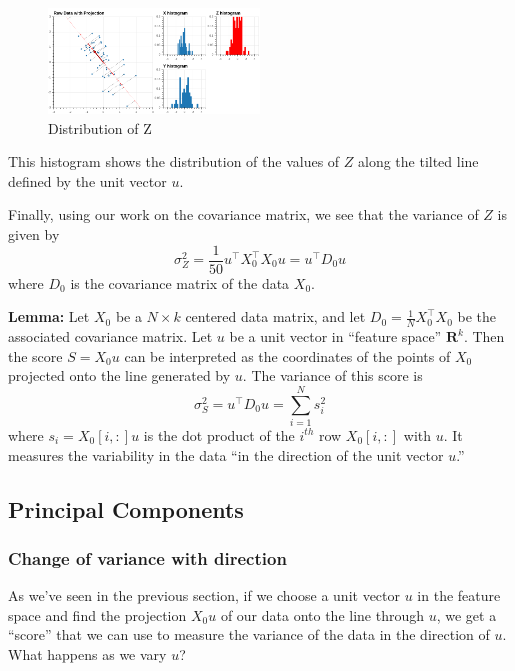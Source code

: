 \documentclass[
]{article}
\begin{document}
\begin{figure}
\hypertarget{fig:pcasimfig-3}{%
\centering
\includegraphics[width=0.5\textwidth,height=\textheight]{../img/PCAsimulated-4.png}
\caption{Distribution of Z}\label{fig:pcasimfig-3}
}
\end{figure}

This histogram shows the distribution of the values of \(Z\) along the
tilted line defined by the unit vector \(u\).

Finally, using our work on the covariance matrix, we see that the
variance of \(Z\) is given by \[
\sigma_{Z}^2 = \frac{1}{50}u^{\intercal}X_{0}^{\intercal}X_{0}u = u^{\intercal}D_{0}u
\] where \(D_{0}\) is the covariance matrix of the data \(X_{0}\).

\textbf{Lemma:} Let \(X_{0}\) be a \(N\times k\) centered data matrix,
and let \(D_{0}=\frac{1}{N}X_{0}^{\intercal}X_{0}\) be the associated
covariance matrix. Let \(u\) be a unit vector in ``feature space''
\(\mathbf{R}^{k}\). Then the score \(S=X_{0}u\) can be interpreted as
the coordinates of the points of \(X_{0}\) projected onto the line
generated by \(u\). The variance of this score is \[
\sigma^{2}_{S} = u^{\intercal}D_{0}u = \sum_{i=1}^{N} s_{i}^2
\] where \(s_{i} = X_{0}[i,:]u\) is the dot product of the \(i^{th}\)
row \(X_{0}[i,:]\) with \(u\). It measures the variability in the data
``in the direction of the unit vector \(u\).''

\hypertarget{principal-components}{%
\subsection{Principal Components}\label{principal-components}}

\hypertarget{change-of-variance-with-direction}{%
\subsubsection{Change of variance with
direction}\label{change-of-variance-with-direction}}

As we've seen in the previous section, if we choose a unit vector \(u\)
in the feature space and find the projection \(X_{0}u\) of our data onto
the line through \(u\), we get a ``score'' that we can use to measure
the variance of the data in the direction of \(u\). What happens as we
vary \(u\)?
\end{document}

